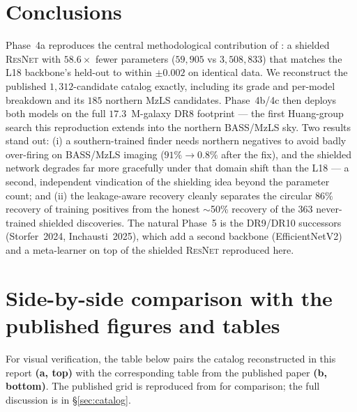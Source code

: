 \documentclass[11pt,letterpaper]{article}
\newcommand{\ResNet}{\textsc{ResNet}}
\begin{document}
\section{Conclusions}

Phase~4a reproduces the central methodological contribution of
\textcite{huang2021desi}: a shielded \ResNet{} with $58.6\times$ fewer
parameters ($59{,}905$ vs $3{,}508{,}833$) that matches the L18 backbone's
held-out \AUC{} to within $\pm0.002$ on identical data. We reconstruct the
published $1{,}312$-candidate catalog exactly, including its grade and
per-model breakdown and its $185$ northern MzLS candidates. Phase~4b/4c then
deploys both models on the full $17.3$~M-galaxy DR8 footprint --- the first
Huang-group search this reproduction extends into the northern BASS/MzLS sky.
Two results stand out: (i) a southern-trained finder needs northern negatives
to avoid badly over-firing on BASS/MzLS imaging ($91\%\to0.8\%$ after the fix),
and the shielded network degrades far more gracefully under that domain shift
than the L18 --- a second, independent vindication of the shielding idea beyond
the parameter count; and (ii) the leakage-aware recovery cleanly separates the
circular $86\%$ recovery of training positives from the honest $\sim$50\%
recovery of the $363$ never-trained shielded discoveries. The natural Phase~5
is the DR9/DR10 successors (Storfer~2024, Inchausti~2025), which add a second
backbone (EfficientNetV2) and a meta-learner on top of the shielded \ResNet{}
reproduced here.

\appendix
\section{Side-by-side comparison with the published figures and tables}
\label{app:compare}

For visual verification, the table below pairs the catalog reconstructed in this
report \textbf{(a, top)} with the corresponding table from the published paper
\textbf{(b, bottom)}. The published grid is reproduced from
\citet{huang2021desi} for comparison; the full discussion is in
\S\ref{sec:catalog}.
\end{document}
